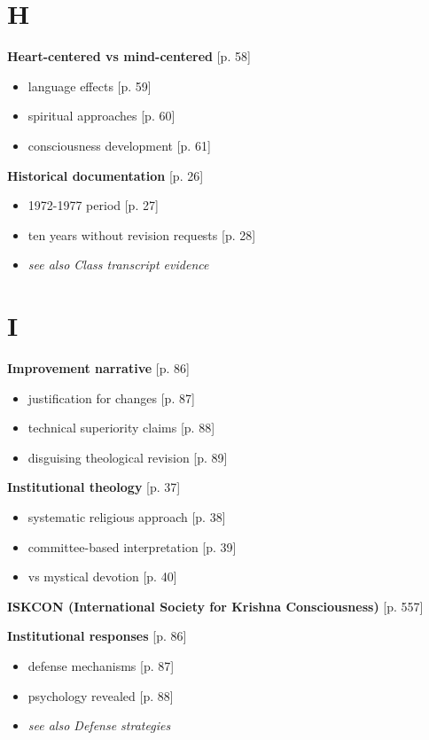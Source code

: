 \documentclass[11pt,twoside]{book}
\begin{document}
\section*{H}
\label{sec:org7d9670a}

\textbf{\textbf{Heart-centered vs mind-centered}} {[}p. 58]
\begin{itemize}
\item language effects [p. 59]
\item spiritual approaches [p. 60]
\item consciousness development [p. 61]
\end{itemize}

\textbf{\textbf{Historical documentation}} {[}p. 26]
\begin{itemize}
\item 1972-1977 period [p. 27]
\item ten years without revision requests [p. 28]
\item \emph{see also Class transcript evidence}
\end{itemize}
\section*{I}
\label{sec:org10cfa3e}

\textbf{\textbf{Improvement narrative}} {[}p. 86]
\begin{itemize}
\item justification for changes [p. 87]
\item technical superiority claims [p. 88]
\item disguising theological revision [p. 89]
\end{itemize}

\textbf{\textbf{Institutional theology}} {[}p. 37]
\begin{itemize}
\item systematic religious approach [p. 38]
\item committee-based interpretation [p. 39]
\item vs mystical devotion [p. 40]
\end{itemize}

\textbf{\textbf{ISKCON (International Society for Krishna Consciousness)}} {[}p. 557]

\textbf{\textbf{Institutional responses}} {[}p. 86]
\begin{itemize}
\item defense mechanisms [p. 87]
\item psychology revealed [p. 88]
\item \emph{see also Defense strategies}
\end{itemize}
\end{document}
